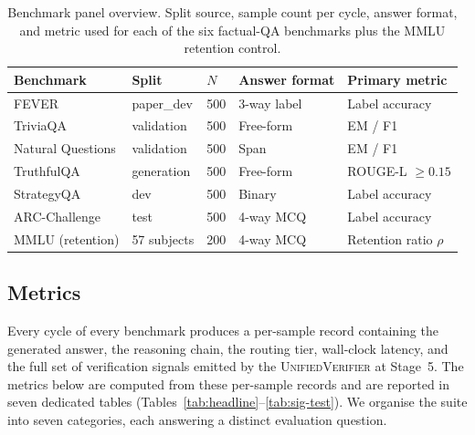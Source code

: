 \begin{table}[t]
\centering
\caption{Benchmark panel overview. Split source, sample count per
cycle, answer format, and metric used for each of the six
factual-QA benchmarks plus the MMLU retention control.}
\label{tab:benchmark-overview}
\begin{tabular}{lllll}
\toprule
Benchmark & Split & $N$ & Answer format & Primary metric \\
\midrule
FEVER               & paper\_dev & 500 & 3-way label    & Label accuracy \\
TriviaQA            & validation & 500 & Free-form      & EM / F1 \\
Natural Questions   & validation & 500 & Span           & EM / F1 \\
TruthfulQA          & generation & 500 & Free-form      & ROUGE-L $\ge 0.15$ \\
StrategyQA          & dev        & 500 & Binary         & Label accuracy \\
ARC-Challenge       & test       & 500 & 4-way MCQ      & Label accuracy \\
MMLU (retention)    & 57 subjects& 200 & 4-way MCQ      & Retention ratio $\rho$ \\
\bottomrule
\end{tabular}
\end{table}

\subsection{Metrics}
\label{sec:metrics}

Every cycle of every benchmark produces a per-sample record containing
the generated answer, the reasoning chain, the routing tier, wall-clock
latency, and the full set of verification signals emitted by the
\textsc{UnifiedVerifier} at Stage~5. The metrics below are computed
from these per-sample records and are reported in seven dedicated
tables (Tables~\ref{tab:headline}--\ref{tab:sig-test}). We organise the
suite into seven categories, each answering a distinct evaluation
question.

